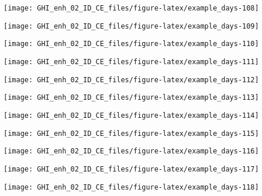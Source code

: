 \documentclass[
  10pt,
  a4paper,oneside]{article}
\begin{document}
\begin{center}\texttt{[image: GHI\_enh\_02\_ID\_CE\_files/figure-latex/example\_days-108]} \end{center}

\begin{center}\texttt{[image: GHI\_enh\_02\_ID\_CE\_files/figure-latex/example\_days-109]} \end{center}

\begin{center}\texttt{[image: GHI\_enh\_02\_ID\_CE\_files/figure-latex/example\_days-110]} \end{center}

\begin{center}\texttt{[image: GHI\_enh\_02\_ID\_CE\_files/figure-latex/example\_days-111]} \end{center}

\begin{center}\texttt{[image: GHI\_enh\_02\_ID\_CE\_files/figure-latex/example\_days-112]} \end{center}

\begin{center}\texttt{[image: GHI\_enh\_02\_ID\_CE\_files/figure-latex/example\_days-113]} \end{center}

\begin{center}\texttt{[image: GHI\_enh\_02\_ID\_CE\_files/figure-latex/example\_days-114]} \end{center}

\begin{center}\texttt{[image: GHI\_enh\_02\_ID\_CE\_files/figure-latex/example\_days-115]} \end{center}

\begin{center}\texttt{[image: GHI\_enh\_02\_ID\_CE\_files/figure-latex/example\_days-116]} \end{center}

\begin{center}\texttt{[image: GHI\_enh\_02\_ID\_CE\_files/figure-latex/example\_days-117]} \end{center}

\begin{center}\texttt{[image: GHI\_enh\_02\_ID\_CE\_files/figure-latex/example\_days-118]} \end{center}
\end{document}
